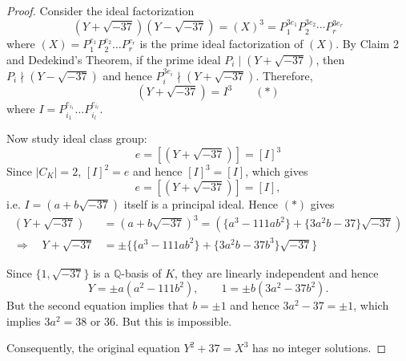 \documentclass[11pt]{book}
\begin{document}
\begin{proof}
\bigskip
Consider the ideal factorization
$$(Y + \sqrt{-37})(Y - \sqrt{-37}) = (X)^3 = P_1^{3e_1} P_2^{3e_2} \cdots P_r^{3e_r}$$ 
where $(X) = P_1^{e_1} P_2^{e_2}\dots P_r^{e_r}$ is the prime ideal factorization of $(X)$. By Claim 2 and Dedekind's Theorem, if the prime ideal $P_i \mid (Y+\sqrt{-37})$, then
$P_i \nmid (Y-\sqrt{-37})$ and hence $P_i^{3e_i} \nmid (Y+\sqrt{-37})$. Therefore,
$$(Y + \sqrt{-37}) = I^3  \quad \quad (*)$$ 
where $I = P_{i_1}^{e_{i_1}}\dots P_{i_l}^{e_{i_l}}$.

Now study ideal class group:
$$e = [(Y + \sqrt{-37})] = [I]^3$$
Since $|C_K| = 2$, $[I]^2 = e$ and hence $[I]^3 = [I]$, which gives
$$e = [(Y + \sqrt{-37})] = [I],$$
i.e. $I = (a+b\sqrt{-37})$ itself is a principal ideal. Hence $(*)$ gives
\begin{align*}
(Y + \sqrt{-37}) &= (a+b\sqrt{-37})^3 = (\{a^3-111ab^2\} + \{3a^2b-37\}\sqrt{-37}) \\ 
\Rightarrow \quad Y + \sqrt{-37} &= \pm\{\{a^3-111ab^2\} + \{3a^2b-37b^3\}\sqrt{-37}\}
\end{align*}

Since $\{1,\sqrt{-37}\}$ is a $\mathbb{Q}$-basis of $K$, they are linearly independent and hence
$$Y = \pm a(a^2-111b^2), \quad \quad  1 = \pm b(3a^2-37b^2).$$
But the second equation implies that $b = \pm 1$ and hence
$3a^2 - 37 = \pm 1$, which implies 
$3a^2 = 38$ or $36$. But this is impossible.

\medskip
Consequently, the original equation $Y^2+37 = X^3$ has no integer solutions.
\end{proof}
\end{document}
